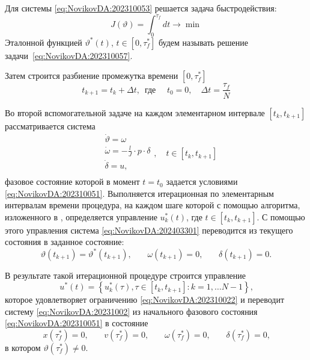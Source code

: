 Для системы \eqref{eq:NovikovDA:202310053} решается задача быстродействия:
\begin{equation}\label{eq:NovikovDA:202310057}
J(\vartheta) = \int_{0}^{\tau_f} dt \to \min
\end{equation}
Эталонной функцией $\vartheta^*(t)$, $t\in[0,\tau^*_f]$ будем называть решение задачи~\eqref{eq:NovikovDA:202310057}.

Затем строится разбиение промежутка времени $[0,\tau^*_f]$
\begin{equation}
t_{k+1}=t_k+\Delta t\text{,~~где~~~~} t_0=0, \quad \Delta t=\frac{\tau_f}{N}
\end{equation}

Во второй вспомогательной задаче на каждом элементарном интервале $[t_k,t_{k+1}]$ рассматривается система
\begin{equation}\label{eq:NovikovDA:202403301}
\begin{aligned}
&\dot{\vartheta}=\omega \\
&\dot{\omega}=-\frac{l}{J}\cdot p\cdot \delta \\
&\dot \delta = u \text{,}\\
\end{aligned}, \quad t \in [t_k,t_{k+1}]
\end{equation} 
фазовое состояние которой в момент $t=t_0$ задается условиями \eqref{eq:NovikovDA:202310051}. Выполняется итерационная по элементарным интервалам времени процедура, на каждом шаге которой с помощью алгоритма, изложенного в \cite{1}, определяется управление $u^*_k(t)$, где $t\in[t_k,t_{k+1}]$. С помощью этого управления система \eqref{eq:NovikovDA:202403301} переводится из текущего состояния в заданное состояние:
\begin{equation}
\vartheta(t_{k+1})=\vartheta^*(t_{k+1})\text{,} \qquad   \omega(t_{k+1})=0\text{,} \qquad  \delta(t_{k+1})=0\text{.}
\end{equation}

В результате такой итерационной процедуре строится управление 
\begin{equation}
u^*(t)=	\left \{u^*_k(\tau), \tau\in[t_k,t_{k+1}] : k=1,\ldots N-1 \right \}\text{,}
\end{equation}
которое удовлетворяет ограничению \eqref{eq:NovikovDA:202310022} и переводит систему \eqref{eq:NovikovDA:20231002} из начального фазового состояния \eqref{eq:NovikovDA:202310051}  в состояние
\begin{equation}\label{eq:NovikovDA:202404141}
x(\tau^*_f)=0\text{,} \qquad  {v}(\tau^*_f) = 0\text{,} \qquad  \omega(\tau^*_f)=0\text{,} \qquad  \delta(\tau^*_f)=0\text{,}
\end{equation}
в котором $\vartheta(\tau^*_f) \neq 0$. 

